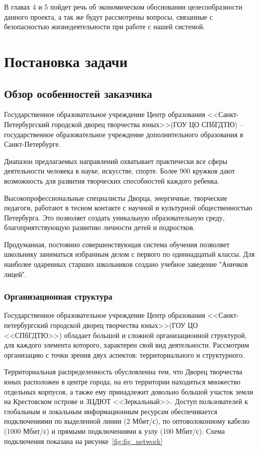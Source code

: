 \documentclass[utf8,usehyperref,12pt]{G7-32}
\begin{document}
В главах 4 и 5 пойдет речь об экономическом обосновании целесообразности данного проекта, а так же будут рассмотрены вопросы, связанные с безопасностью жизнедеятельности при работе с нашей системой.

\mainmatter %

\chapter{Постановка задачи}
\section{Обзор особенностей заказчика}
Государственное образовательное учреждение Центр образования <<Санкт-Петербургский городской дворец творчества юных>>(ГОУ ЦО СПбГДТЮ) -- государственное образовательное учреждение дополнительного образования в Санкт-Петербурге.

Диапазон предлагаемых направлений охватывает практически все сферы деятельности человека в науке, искусстве, спорте. Более 900 кружков дают возможность для развития творческих способностей каждого ребенка.

Высокопрофессиональные специалисты Дворца, энергичные, творческие педагоги, работают в тесном контакте с научной и культурной общественностью Петербурга. Это позволяет создать уникальную образовательную среду, благоприятствующую развитию личности детей и подростков.

Продуманная, постоянно совершенствующая система обучения позволяет школьнику заниматься избранным делом с первого по одиннадцатый классы. Для наиболее одаренных старших школьников создано учебное заведение "Аничков лицей".

\subsection{Организационная структура}
Государственное образовательное учреждение Центр образования <<Санкт-петербургский городской дворец творчества юных>>(ГОУ ЦО <<СПбГДТЮ>>) обладает большой и сложной организационной структурой, для каждого элемента которого, характерен свой вид деятельности. Рассмотрим организацию с точки зрения двух аспектов: территориального и структурного.

Территориальная распределенность обусловленна тем, что Дворец творчества юных расположен в центре города, на его территории находиться множество отдельных корпусов, а также ему принадлежит довольно большой участок земли на Крестовском острове и ЗЦДЮТ <<Зеркальный>>. Доступ пользователей к глобальным и локальным информационным ресурсам обеспечивается подключениями по выделенной линии (2 Мбит/с), по оптоволоконному кабелю (1000 Мбит/с) и прямыми подключениями к узлу (100 Мбит/с). Схема подключения показана на рисунке~\ref{fig:fig_network} 
\end{document}
